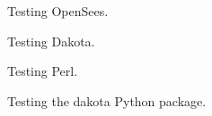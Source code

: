 \begin{figure}[!htbp]
  \caption{Testing OpenSees.}
  \label{fig:opensees_test}
\end{figure}

\begin{figure}[!htbp]
  \caption{Testing Dakota.}
  \label{fig:dakota_test}
\end{figure}

\begin{figure}[!htbp]
  \caption{Testing Perl.}
  \label{fig:perl_test}
\end{figure}

\begin{figure}[!htbp]
  \caption{Testing the dakota Python package.}
  \label{fig:dakota_py_test}
\end{figure}

